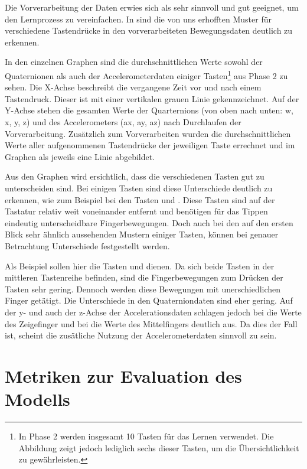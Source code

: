 Die Vorverarbeitung der Daten erwies sich als sehr sinnvoll und gut geeignet, um den Lernprozess zu vereinfachen. In  sind die von uns erhofften Muster für verschiedene Tastendrücke in den vorverarbeiteten Bewegungsdaten deutlich zu erkennen.

In den einzelnen Graphen sind die durchschnittlichen Werte sowohl der Quaternionen als auch der Accelerometerdaten einiger Tasten\footnote{In Phase 2 werden insgesamt 10 Tasten für das Lernen verwendet. Die Abbildung zeigt jedoch lediglich sechs dieser Tasten, um die Übersichtlichkeit zu gewährleisten.} aus Phase 2 zu sehen. Die X-Achse beschreibt die vergangene Zeit vor und nach einem Tastendruck. Dieser ist mit einer vertikalen grauen Linie gekennzeichnet. Auf der Y-Achse stehen die gesamten Werte der Quarternions (von oben nach unten: w, x, y, z) und des Accelerometers (ax, ay, az) nach Durchlaufen der Vorverarbeitung. Zusätzlich zum Vorverarbeiten wurden die durchschnittlichen Werte aller aufgenommenen Tastendrücke der jeweiligen Taste errechnet und im Graphen als jeweils eine Linie abgebildet.

Aus den Graphen wird ersichtlich, dass die verschiedenen Tasten gut zu unterscheiden sind. Bei einigen Tasten sind diese Unterschiede deutlich zu erkennen, wie zum Beispiel bei den Tasten  und . Diese Tasten sind auf der Tastatur relativ weit voneinander entfernt und benötigen für das Tippen eindeutig unterscheidbare Fingerbewegungen. Doch auch bei den auf den ersten Blick sehr ähnlich aussehenden Mustern einiger Tasten, können bei genauer Betrachtung Unterschiede festgestellt werden.

Als Beispiel sollen hier die Tasten  und  dienen. Da sich beide Tasten in der mittleren Tastenreihe befinden, sind die Fingerbewegungen zum Drücken der Tasten sehr gering. Dennoch werden diese Bewegungen mit unerschiedlichen Finger getätigt. Die Unterschiede in den Quaterniondaten sind eher gering. Auf der y- und auch der z-Achse der Accelerationsdaten schlagen jedoch bei  die Werte des Zeigefinger und bei  die Werte des Mittelfingers deutlich aus. Da dies der Fall ist, scheint die zusätliche Nutzung der Accelerometerdaten sinnvoll zu sein.

\section{Metriken zur Evaluation des Modells}

